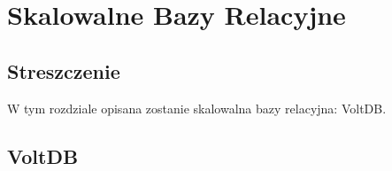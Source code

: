 \chapter{Skalowalne Bazy Relacyjne}

\section*{Streszczenie}
W tym rozdziale opisana zostanie skalowalna bazy relacyjna: VoltDB.

\section{VoltDB}
\label{sec:voltdb}